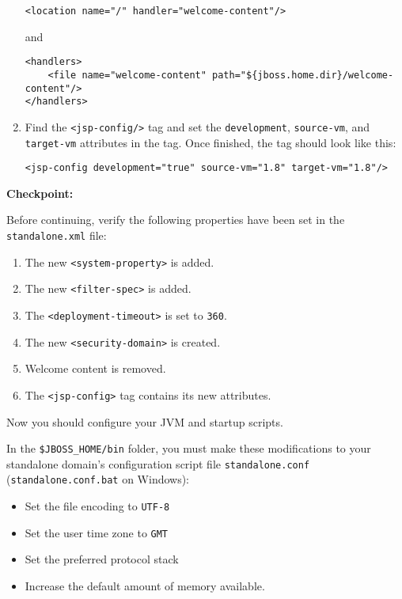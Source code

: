 \begin{enumerate}
\begin{verbatim}
<location name="/" handler="welcome-content"/>
\end{verbatim}

  and

\begin{verbatim}
<handlers>
    <file name="welcome-content" path="${jboss.home.dir}/welcome-content"/>
</handlers>
\end{verbatim}
\item
  Find the \texttt{\textless{}jsp-config/\textgreater{}} tag and set the
  \texttt{development}, \texttt{source-vm}, and \texttt{target-vm}
  attributes in the tag. Once finished, the tag should look like this:

\begin{verbatim}
<jsp-config development="true" source-vm="1.8" target-vm="1.8"/>
\end{verbatim}
\end{enumerate}

\textbf{Checkpoint:}

Before continuing, verify the following properties have been set in the
\texttt{standalone.xml} file:

\begin{enumerate}
\def\labelenumi{\arabic{enumi}.}
\item
  The new \texttt{\textless{}system-property\textgreater{}} is added.
\item
  The new \texttt{\textless{}filter-spec\textgreater{}} is added.
\item
  The \texttt{\textless{}deployment-timeout\textgreater{}} is set to
  \texttt{360}.
\item
  The new \texttt{\textless{}security-domain\textgreater{}} is created.
\item
  Welcome content is removed.
\item
  The \texttt{\textless{}jsp-config\textgreater{}} tag contains its new
  attributes.
\end{enumerate}

Now you should configure your JVM and startup scripts.

In the \texttt{\$JBOSS\_HOME/bin} folder, you must make these
modifications to your standalone domain's configuration script file
\texttt{standalone.conf} (\texttt{standalone.conf.bat} on Windows):

\begin{itemize}
\tightlist
\item
  Set the file encoding to \texttt{UTF-8}
\item
  Set the user time zone to \texttt{GMT}
\item
  Set the preferred protocol stack
\item
  Increase the default amount of memory available.
\end{itemize}

